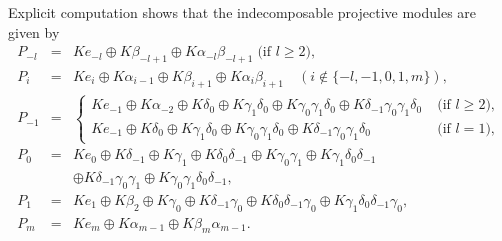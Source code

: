 \documentclass[12pt]{amsart}
\numberwithin{equation}{thm}
\begin{document}
Explicit computation shows that the indecomposable projective modules are given by
\[\begin{array}{lcl}
P_{-l} &=& Ke_{-l}\oplus K\beta_{-l+1} \oplus K\alpha_{-l}\beta_{-l+1} \;\text{(if $l\ge 2$)}, \\
P_{i} &=& Ke_{i} \oplus  K\alpha_{i-1} \oplus K\beta_{i+1}\oplus K\alpha_{i}\beta_{i+1} \quad (i\notin \{-l, -1,0,1,m\}), \\
P_{-1} &=& \begin{cases}
Ke_{-1}\oplus K\alpha_{-2}\oplus K\delta_{0} \oplus K\gamma_{1}\delta_{0}
\oplus K\gamma_{0}\gamma_{1}\delta_{0} \oplus K\delta_{-1}\gamma_{0}\gamma_1\delta_0 \;&\text{(if $l\ge2$)},\\
Ke_{-1}\oplus K\delta_{0} \oplus K\gamma_{1}\delta_{0}
\oplus K\gamma_{0}\gamma_{1}\delta_{0} \oplus K\delta_{-1}\gamma_{0}\gamma_1\delta_0 \;&\text{(if $l=1$)},
\end{cases}\\
P_{0} &=& Ke_0\oplus K\delta_{-1}\oplus K\gamma_{1} \oplus K\delta_{0}\delta_{-1} \oplus K\gamma_{0}\gamma_{1}\oplus K\gamma_{1}\delta_{0}\delta_{-1} \\
        & & \oplus K\delta_{-1}\gamma_{0}\gamma_{1}\oplus K\gamma_0\gamma_1\delta_0\delta_{-1}, \\
P_1  &=& Ke_1\oplus K\beta_2\oplus K\gamma_0\oplus K\delta_{-1}\gamma_0\oplus K\delta_{0}\delta_{-1}\gamma_0\oplus K\gamma_{1}\delta_0\delta_{-1}\gamma_{0}, \\
P_m &=& Ke_m\oplus K\alpha_{m-1} \oplus K\beta_m\alpha_{m-1}.     
\end{array} \]
\end{document}
